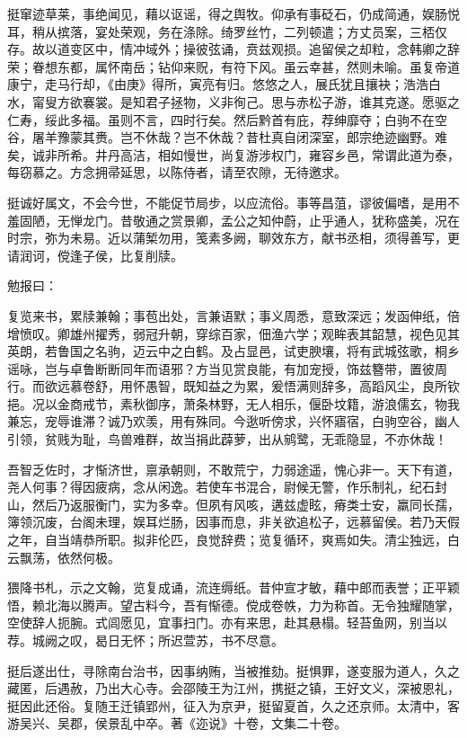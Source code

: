 \documentclass[12pt,UTF8]{ctexbook}
\begin{document}
挺窜迹草莱，事绝闻见，藉以讴谣，得之舆牧。仰承有事砭石，仍成简通，娱肠悦耳，稍从摈落，宴处荣观，务在涤除。绮罗丝竹，二列顿遣；方丈员案，三桮仅存。故以道变区中，情冲域外；操彼弦诵，贲兹观损。追留侯之却粒，念韩卿之辞荣；眷想东都，属怀南岳；钻仰来贶，有符下风。虽云幸甚，然则未喻。虽复帝道康宁，走马行却，《由庚》得所，寅亮有归。悠悠之人，展氏犹且攘袂；浩浩白水，甯叟方欲褰裳。是知君子拯物，义非徇己。思与赤松子游，谁其克遂。愿驱之仁寿，绥此多福。虽则不言，四时行矣。然后黔首有庇，荐绅靡夺；白驹不在空谷，屠羊豫蒙其赉。岂不休哉？岂不休哉？昔杜真自闭深室，郎宗绝迹幽野。难矣，诚非所希。井丹高洁，相如慢世，尚复游涉权门，雍容乡邑，常谓此道为泰，每窃慕之。方念拥帚延思，以陈侍者，请至农隙，无待邀求。

挺诚好属文，不会今世，不能促节局步，以应流俗。事等昌菹，谬彼偏嗜，是用不羞固陋，无惮龙门。昔敬通之赏景卿，孟公之知仲蔚，止乎通人，犹称盛美，况在时宗，弥为未易。近以蒲椠勿用，笺素多阙，聊效东方，献书丞相，须得善写，更请润诃，傥逢子侯，比复削牍。

勉报曰：

复览来书，累牍兼翰；事苞出处，言兼语默；事义周悉，意致深远；发函伸纸，倍增愤叹。卿雄州擢秀，弱冠升朝，穿综百家，佃渔六学；观眸表其韶慧，视色见其英朗，若鲁国之名驹，迈云中之白鹤。及占显邑，试吏腴壤，将有武城弦歌，桐乡谣咏，岂与卓鲁断断同年而语邪？方当见赏良能，有加宠授，饰兹簪带，置彼周行。而欲远慕卷舒，用怀愚智，既知益之为累，爰悟满则辞多，高蹈风尘，良所钦挹。况以金商戒节，素秋御序，萧条林野，无人相乐，偃卧坟籍，游浪儒玄，物我兼忘，宠辱谁滞？诚乃欢羡，用有殊同。今逖听傍求，兴怀寤宿，白驹空谷，幽人引领，贫贱为耻，鸟兽难群，故当捐此薜萝，出从鹓鹭，无乖隐显，不亦休哉！

吾智乏佐时，才惭济世，禀承朝则，不敢荒宁，力弱途遥，愧心非一。天下有道，尧人何事？得因疲病，念从闲逸。若使车书混合，尉候无警，作乐制礼，纪石封山，然后乃返服衡门，实为多幸。但夙有风咳，遘兹虚眩，瘠类士安，羸同长孺，簿领沉废，台阁未理，娱耳烂肠，因事而息，非关欲追松子，远慕留侯。若乃天假之年，自当靖恭所职。拟非伦匹，良觉辞费；览复循环，爽焉如失。清尘独远，白云飘荡，依然何极。

猥降书札，示之文翰，览复成诵，流连缛纸。昔仲宣才敏，藉中郎而表誉；正平颖悟，赖北海以腾声。望古料今，吾有惭德。傥成卷帙，力为称首。无令独耀随掌，空使辞人扼腕。式闾愿见，宜事扫门。亦有来思，赴其悬榻。轻苔鱼网，别当以荐。城阙之叹，曷日无怀；所迟萱苏，书不尽意。

挺后遂出仕，寻除南台治书，因事纳贿，当被推劾。挺惧罪，遂变服为道人，久之藏匿，后遇赦，乃出大心寺。会邵陵王为江州，携挺之镇，王好文义，深被恩礼，挺因此还俗。复随王迁镇郢州，征入为京尹，挺留夏首，久之还京师。太清中，客游吴兴、吴郡，侯景乱中卒。著《迩说》十卷，文集二十卷。
\end{document}
